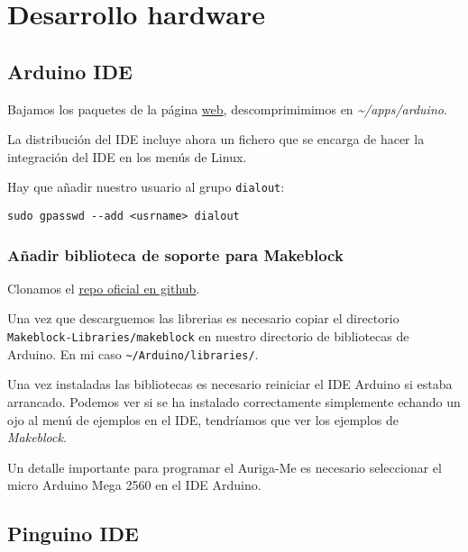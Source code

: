 \documentclass[
  12pt,
  spanish,
]{article}
\begin{document}
\hypertarget{desarrollo-hardware}{%
\section{Desarrollo hardware}\label{desarrollo-hardware}}

\hypertarget{arduino-ide}{%
\subsection{Arduino IDE}\label{arduino-ide}}

Bajamos los paquetes de la página \href{https://www.arduino.cc}{web},
descomprimimimos en \emph{\textasciitilde/apps/arduino}.

La distribución del IDE incluye ahora un fichero que se encarga de hacer
la integración del IDE en los menús de Linux.

Hay que añadir nuestro usuario al grupo \texttt{dialout}:

\begin{verbatim}
sudo gpasswd --add <usrname> dialout
\end{verbatim}

\hypertarget{auxf1adir-biblioteca-de-soporte-para-makeblock}{%
\subsubsection{Añadir biblioteca de soporte para
Makeblock}\label{auxf1adir-biblioteca-de-soporte-para-makeblock}}

Clonamos el
\href{https://github.com/Makeblock-official/Makeblock-Libraries}{repo
oficial en github}.

Una vez que descarguemos las librerias es necesario copiar el directorio
\texttt{Makeblock-Libraries/makeblock} en nuestro directorio de
bibliotecas de Arduino. En mi caso
\texttt{\textasciitilde{}/Arduino/libraries/}.

Una vez instaladas las bibliotecas es necesario reiniciar el IDE Arduino
si estaba arrancado. Podemos ver si se ha instalado correctamente
simplemente echando un ojo al menú de ejemplos en el IDE, tendríamos que
ver los ejemplos de \emph{Makeblock}.

Un detalle importante para programar el Auriga-Me es necesario
seleccionar el micro Arduino Mega 2560 en el IDE Arduino.

\hypertarget{pinguino-ide}{%
\subsection{Pinguino IDE}\label{pinguino-ide}}
\end{document}
